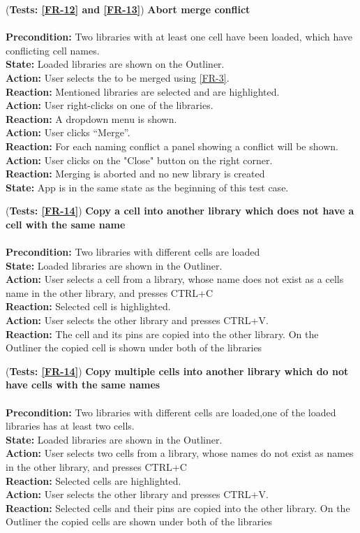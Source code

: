 \documentclass[10pt,a4paper]{report}
\newcommand{\precondition}[1]{
    \textbf{Precondition: } #1 \leavevmode \\
}
\newcommand{\action}[1]{
    \textbf{Action: } #1 \leavevmode \\
}
\newcommand{\state}[1]{
    \textbf{State: } #1 \leavevmode \\
}
\newcommand{\reaction}[1]{
    \textbf{Reaction: } #1 \leavevmode \\
}
\newcommand{\GTCDescription}[2]{
    (\textbf{Tests: #1}) \textbf{#2} \leavevmode \\
}
\begin{document}
\begin{GTC}
    \item \GTCDescription{\ref{FR-12} and \ref{FR-13}}
    {Abort merge conflict} \leavevmode \\ 
        \precondition{Two libraries with at least one cell have been loaded, which have conflicting cell names.}
        \state{Loaded libraries are shown on the Outliner.}
        \action{User selects the to be merged using \ref{FR-3}.}
        \reaction{Mentioned libraries are selected and are highlighted.}\action{User right-clicks on one of the libraries.}
        \reaction{A dropdown menu is shown.}
        \action{User clicks “Merge”.}
        \reaction{For each naming conflict a panel showing a conflict will be shown.}
        \action{User clicks on the "Close" button on the right corner.}
        \reaction{Merging is aborted and no new library is created}
        \state{App is in the same state as the beginning of this test case.}\label{GTC-30}
        
        
    
    \item \GTCDescription{\ref{FR-14}}
    {Copy a cell into another library which does not have a cell with the same name}\leavevmode \\ 
        \precondition{Two libraries with different cells are loaded}
        \state{Loaded libraries are shown in the Outliner.}
        \action{User selects a cell from a library, whose name does not exist as a cells name in the other library, and presses CTRL+C}
        \reaction{Selected cell is highlighted.}
        \action{User selects the other library and presses CTRL+V.}
        \reaction{The cell and its pins are copied into the other library. On the Outliner the copied cell is shown under both of the libraries}\label{GTC-31}
        
         \item \GTCDescription{\ref{FR-14}}
    {Copy multiple cells into another library which do not have cells with the same names}\leavevmode \\ 
        \precondition{Two libraries with different cells are loaded,one of the loaded libraries has at least two cells.}
        \state{Loaded libraries are shown in the Outliner.}
        \action{User selects two cells from a library, whose names do not exist as names in the other library, and presses CTRL+C}
        \reaction{Selected cells are highlighted.}
        \action{User selects the other library and presses CTRL+V.}
        \reaction{Selected cells and their pins are copied into the other library. On the Outliner the copied cells are shown under both of the libraries}\label{GTC-32}
    

\end{GTC}
\end{document}
